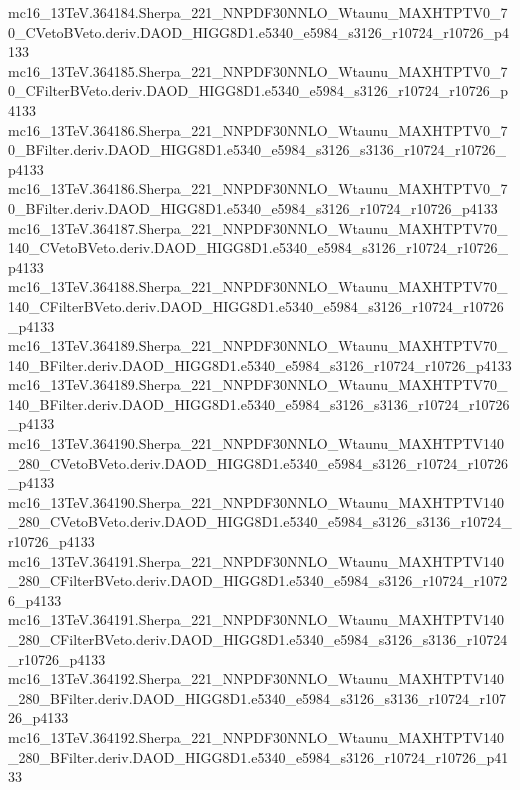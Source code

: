 \begin{scriptsize}
mc16\_13TeV.364184.Sherpa\_221\_NNPDF30NNLO\_Wtaunu\_MAXHTPTV0\_70\_CVetoBVeto.deriv.DAOD\_HIGG8D1.e5340\_e5984\_s3126\_r10724\_r10726\_p4133 \\
mc16\_13TeV.364185.Sherpa\_221\_NNPDF30NNLO\_Wtaunu\_MAXHTPTV0\_70\_CFilterBVeto.deriv.DAOD\_HIGG8D1.e5340\_e5984\_s3126\_r10724\_r10726\_p4133 \\
mc16\_13TeV.364186.Sherpa\_221\_NNPDF30NNLO\_Wtaunu\_MAXHTPTV0\_70\_BFilter.deriv.DAOD\_HIGG8D1.e5340\_e5984\_s3126\_s3136\_r10724\_r10726\_p4133 \\
mc16\_13TeV.364186.Sherpa\_221\_NNPDF30NNLO\_Wtaunu\_MAXHTPTV0\_70\_BFilter.deriv.DAOD\_HIGG8D1.e5340\_e5984\_s3126\_r10724\_r10726\_p4133 \\
mc16\_13TeV.364187.Sherpa\_221\_NNPDF30NNLO\_Wtaunu\_MAXHTPTV70\_140\_CVetoBVeto.deriv.DAOD\_HIGG8D1.e5340\_e5984\_s3126\_r10724\_r10726\_p4133 \\
mc16\_13TeV.364188.Sherpa\_221\_NNPDF30NNLO\_Wtaunu\_MAXHTPTV70\_140\_CFilterBVeto.deriv.DAOD\_HIGG8D1.e5340\_e5984\_s3126\_r10724\_r10726\_p4133 \\
mc16\_13TeV.364189.Sherpa\_221\_NNPDF30NNLO\_Wtaunu\_MAXHTPTV70\_140\_BFilter.deriv.DAOD\_HIGG8D1.e5340\_e5984\_s3126\_r10724\_r10726\_p4133 \\
mc16\_13TeV.364189.Sherpa\_221\_NNPDF30NNLO\_Wtaunu\_MAXHTPTV70\_140\_BFilter.deriv.DAOD\_HIGG8D1.e5340\_e5984\_s3126\_s3136\_r10724\_r10726\_p4133 \\
mc16\_13TeV.364190.Sherpa\_221\_NNPDF30NNLO\_Wtaunu\_MAXHTPTV140\_280\_CVetoBVeto.deriv.DAOD\_HIGG8D1.e5340\_e5984\_s3126\_r10724\_r10726\_p4133 \\
mc16\_13TeV.364190.Sherpa\_221\_NNPDF30NNLO\_Wtaunu\_MAXHTPTV140\_280\_CVetoBVeto.deriv.DAOD\_HIGG8D1.e5340\_e5984\_s3126\_s3136\_r10724\_r10726\_p4133 \\
mc16\_13TeV.364191.Sherpa\_221\_NNPDF30NNLO\_Wtaunu\_MAXHTPTV140\_280\_CFilterBVeto.deriv.DAOD\_HIGG8D1.e5340\_e5984\_s3126\_r10724\_r10726\_p4133 \\
mc16\_13TeV.364191.Sherpa\_221\_NNPDF30NNLO\_Wtaunu\_MAXHTPTV140\_280\_CFilterBVeto.deriv.DAOD\_HIGG8D1.e5340\_e5984\_s3126\_s3136\_r10724\_r10726\_p4133 \\
mc16\_13TeV.364192.Sherpa\_221\_NNPDF30NNLO\_Wtaunu\_MAXHTPTV140\_280\_BFilter.deriv.DAOD\_HIGG8D1.e5340\_e5984\_s3126\_s3136\_r10724\_r10726\_p4133 \\
mc16\_13TeV.364192.Sherpa\_221\_NNPDF30NNLO\_Wtaunu\_MAXHTPTV140\_280\_BFilter.deriv.DAOD\_HIGG8D1.e5340\_e5984\_s3126\_r10724\_r10726\_p4133 \\

\end{scriptsize}
